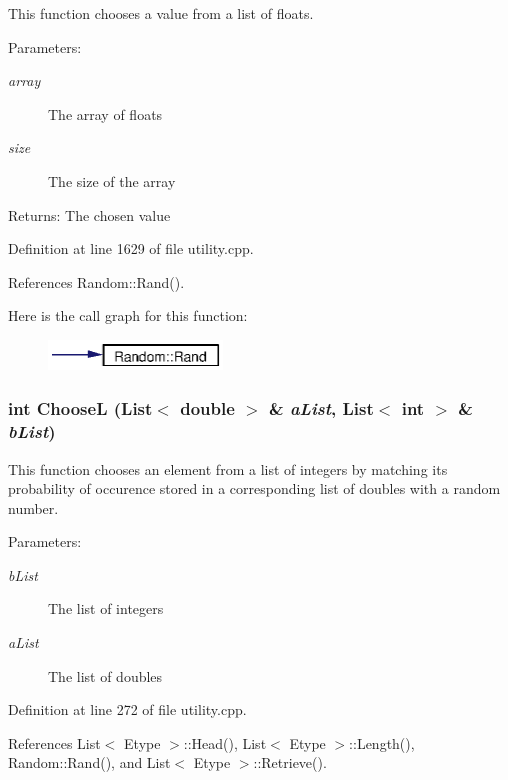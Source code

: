 This function chooses a value from a list of floats. \begin{Desc}
\item[Parameters:]
\begin{description}
\item[{\em array}]The array of floats \item[{\em size}]The size of the array \end{description}
\end{Desc}
\begin{Desc}
\item[Returns:]The chosen value \end{Desc}


Definition at line 1629 of file utility.cpp.

References Random::Rand().

Here is the call graph for this function:\begin{figure}[H]
\begin{center}
\leavevmode
\includegraphics[width=131pt]{utility_8cpp_a28_cgraph}
\end{center}
\end{figure}
\subsubsection{\setlength{\rightskip}{0pt plus 5cm}int Choose\-L ({\bf List}$<$ double $>$ \& {\em a\-List}, {\bf List}$<$ int $>$ \& {\em b\-List})}\label{utility_8cpp_a9}


This function chooses an element from a list of integers by matching its probability of occurence stored in a corresponding list of doubles with a random number. \begin{Desc}
\item[Parameters:]
\begin{description}
\item[{\em b\-List}]The list of integers \item[{\em a\-List}]The list of doubles \end{description}
\end{Desc}


Definition at line 272 of file utility.cpp.

References List$<$ Etype $>$::Head(), List$<$ Etype $>$::Length(), Random::Rand(), and List$<$ Etype $>$::Retrieve().

